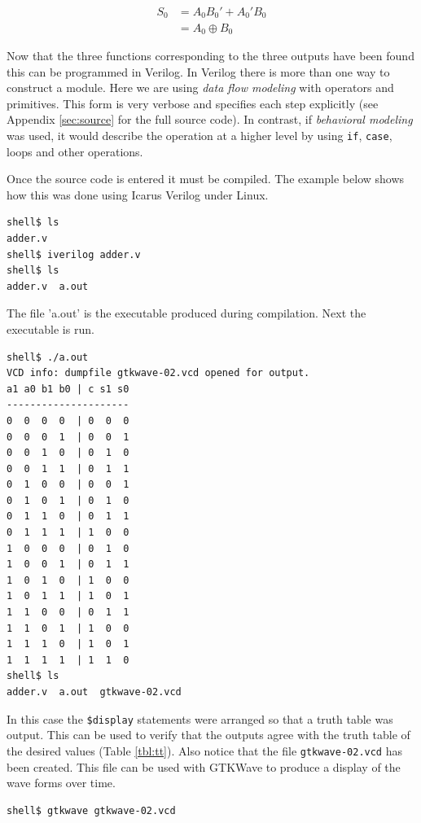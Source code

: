 \documentclass[12pt]{article}
\begin{document}
\begin{align}
S_0 &= A_0 B_0' + A_0' B_0 \label{eq:s0sop} \\
	&= A_0 \oplus B_0 \label{eq:s0}
\end{align}

Now that the three functions corresponding to the three outputs have
been found this can be programmed in Verilog.
In Verilog there is more than one way to construct a module.
Here we are using \emph{data flow modeling} with operators and
primitives.
This form is very verbose and specifies each step explicitly
(see Appendix \ref{sec:source} for the full source code).
In contrast, if \emph{behavioral modeling} was used, it would
describe the operation at a higher level by using
\verb+if+, \verb+case+, loops and other operations.

Once the source code is entered it must be compiled.
The example below shows how this was done using Icarus Verilog \cite{VERILOG}
under Linux.

\begin{verbatim}
shell$ ls
adder.v
shell$ iverilog adder.v
shell$ ls
adder.v  a.out
\end{verbatim}

The file 'a.out' is the executable produced during compilation.
Next the executable is run.

\begin{verbatim}
shell$ ./a.out 
VCD info: dumpfile gtkwave-02.vcd opened for output.
a1 a0 b1 b0 | c s1 s0
---------------------
0  0  0  0  | 0  0  0
0  0  0  1  | 0  0  1
0  0  1  0  | 0  1  0
0  0  1  1  | 0  1  1
0  1  0  0  | 0  0  1
0  1  0  1  | 0  1  0
0  1  1  0  | 0  1  1
0  1  1  1  | 1  0  0
1  0  0  0  | 0  1  0
1  0  0  1  | 0  1  1
1  0  1  0  | 1  0  0
1  0  1  1  | 1  0  1
1  1  0  0  | 0  1  1
1  1  0  1  | 1  0  0
1  1  1  0  | 1  0  1
1  1  1  1  | 1  1  0
shell$ ls
adder.v  a.out  gtkwave-02.vcd
\end{verbatim}

In this case the \verb+$display+ statements were arranged so that
a truth table was output.
This can be used to verify that the outputs agree with the
truth table of the desired values (Table \ref{tbl:tt}).
Also notice that the file \verb+gtkwave-02.vcd+ has been created.
This file can be used with GTKWave to produce a display of the wave
forms over time.

\begin{verbatim}
shell$ gtkwave gtkwave-02.vcd
\end{verbatim}
\end{document}
